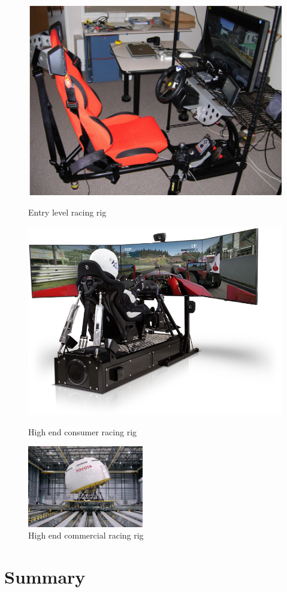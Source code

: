 \begin{figure}
	\centering
	\begin{minipage}{0.45\textwidth}
		\centering
		\includegraphics[width=\textwidth]{images/rig1}
		\caption{Entry level racing rig}
		\label{fig:Entrylevelracingrig}
	\end{minipage}\hfill
	\begin{minipage}{0.45\textwidth}
		\centering
		\includegraphics[width=\textwidth]{images/rig2}
		\caption{High end consumer racing rig}
		\label{fig:Highendconsumerracingrig}
	\end{minipage}
		\centering
		\includegraphics[width=0.45\textwidth]{images/rig3.png}
		\caption{High end commercial racing rig}
		\label{fig:commercialracingrig}
\end{figure}

\section{Summary}







